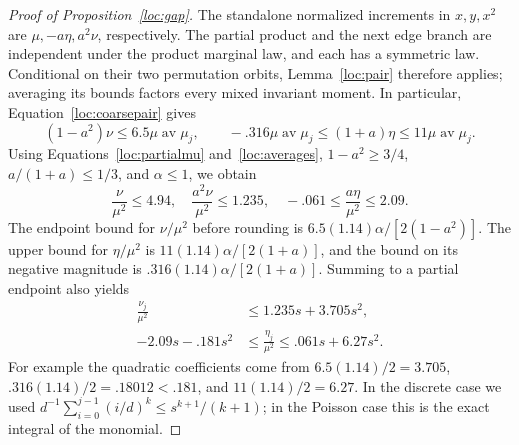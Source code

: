 \begin{proof}[Proof of Proposition~\ref{loc:gap}]
The standalone normalized increments in $x,y,x^2$ are
$\mu,-a\eta,a^2\nu$, respectively.  The partial product and the next
edge branch are independent under
the product marginal law, and each has a symmetric law.  Conditional
on their two permutation orbits, Lemma~\ref{loc:pair} therefore applies;
averaging its bounds factors every mixed invariant moment.  In particular,
Equation~\eqref{loc:coarsepair} gives
\[
 (1-a^2)\nu\le6.5\mu\operatorname{av}\mu_j,
 \qquad
 -.316\mu\operatorname{av}\mu_j
 \le(1+a)\eta\le11\mu\operatorname{av}\mu_j.
\]
Using Equations~\eqref{loc:partialmu} and~\eqref{loc:averages},
$1-a^2\ge3/4$, $a/(1+a)\le1/3$, and $\alpha\le1$, we obtain
\begin{equation}\label{loc:coarse}
 \frac{\nu}{\mu^2}\le4.94,\quad
 \frac{a^2\nu}{\mu^2}\le1.235,\quad
 -.061\le\frac{a\eta}{\mu^2}\le2.09.
\end{equation}
The endpoint bound for $\nu/\mu^2$ before rounding is
$6.5(1.14)\alpha/[2(1-a^2)]$.  The upper bound for $\eta/\mu^2$ is
$11(1.14)\alpha/[2(1+a)]$, and the bound on its negative magnitude is
$.316(1.14)\alpha/[2(1+a)]$.
Summing to a partial endpoint also yields
\begin{align}
 \frac{\nu_j}{\mu^2}&\le1.235s+3.705s^2,\label{loc:partialnu}\\
 -2.09s-.181s^2
 &\le\frac{\eta_j}{\mu^2}\le .061s+6.27s^2.
 \label{loc:partialeta}
\end{align}
For example the quadratic coefficients come from
$6.5(1.14)/2=3.705$,
$.316(1.14)/2=.18012<.181$, and
$11(1.14)/2=6.27$.
In the discrete case we used
$d^{-1}\sum_{i=0}^{j-1}(i/d)^k\le s^{k+1}/(k+1)$;
in the Poisson case this is the exact integral of the monomial.


\end{proof}
